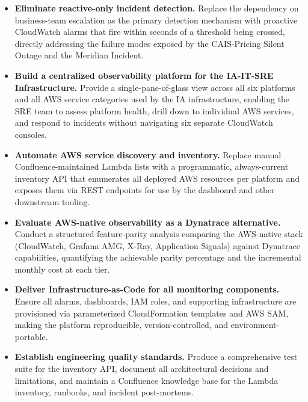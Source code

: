 \begin{itemize}

    \item \textbf{Eliminate reactive-only incident detection.} Replace the
          dependency on business-team escalation as the primary detection
          mechanism with proactive CloudWatch alarms that fire within seconds
          of a threshold being crossed, directly addressing the failure modes
          exposed by the CAIS-Pricing Silent Outage and the Meridian Incident.

    \item \textbf{Build a centralized observability platform for the IA-IT-SRE
          Infrastructure.} Provide a single-pane-of-glass view across all six
          platforms and all AWS service categories used by the IA infrastructure, enabling the SRE team
          to assess platform health, drill down to individual AWS services, and
          respond to incidents without navigating six separate CloudWatch consoles.

    \item \textbf{Automate AWS service discovery and inventory.} Replace manual
          Confluence-maintained Lambda lists with a programmatic, always-current
          inventory API that enumerates all deployed AWS resources per platform
          and exposes them via REST endpoints for use by the dashboard and other
          downstream tooling.

    \item \textbf{Evaluate AWS-native observability as a Dynatrace alternative.}
          Conduct a structured feature-parity analysis comparing the AWS-native
          stack (CloudWatch, Grafana AMG, X-Ray, Application Signals) against
          Dynatrace capabilities, quantifying the achievable parity percentage
          and the incremental monthly cost at each tier.

    \item \textbf{Deliver Infrastructure-as-Code for all monitoring components.}
          Ensure all alarms, dashboards, IAM roles, and supporting infrastructure
          are provisioned via parameterized CloudFormation templates and AWS SAM,
          making the platform reproducible, version-controlled, and
          environment-portable.

    \item \textbf{Establish engineering quality standards.} Produce a comprehensive test suite
          for the inventory API, document all
          architectural decisions and limitations, and maintain a Confluence
          knowledge base for the Lambda inventory, runbooks, and incident
          post-mortems.

\end{itemize}


